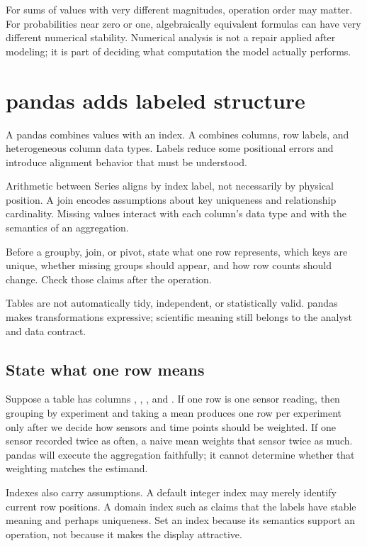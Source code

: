 For sums of values with very different magnitudes, operation order may matter.
For probabilities near zero or one, algebraically equivalent formulas can have
very different numerical stability. Numerical analysis is not a repair applied
after modeling; it is part of deciding what computation the model actually
performs.

\section{pandas adds labeled structure}

A pandas  combines values with an index. A 
combines columns, row labels, and heterogeneous column data types. Labels reduce
some positional errors and introduce alignment behavior that must be understood.

Arithmetic between Series aligns by index label, not necessarily by physical
position. A join encodes assumptions about key uniqueness and relationship
cardinality. Missing values interact with each column's data type and with the
semantics of an aggregation.

\begin{professionalbox}
Before a groupby, join, or pivot, state what one row represents, which keys are
unique, whether missing groups should appear, and how row counts should change.
Check those claims after the operation.
\end{professionalbox}

Tables are not automatically tidy, independent, or statistically valid. pandas
makes transformations expressive; scientific meaning still belongs to the
analyst and data contract.

\subsection*{State what one row means}

Suppose a table has columns , , ,
and . If one row is one sensor reading, then grouping by
experiment and taking a mean produces one row per experiment only after we
decide how sensors and time points should be weighted. If one sensor recorded
twice as often, a naive mean weights that sensor twice as much. pandas will
execute the aggregation faithfully; it cannot determine whether that weighting
matches the estimand.

Indexes also carry assumptions. A default integer index may merely identify
current row positions. A domain index such as  claims that
the labels have stable meaning and perhaps uniqueness. Set an index because its
semantics support an operation, not because it makes the display attractive.

